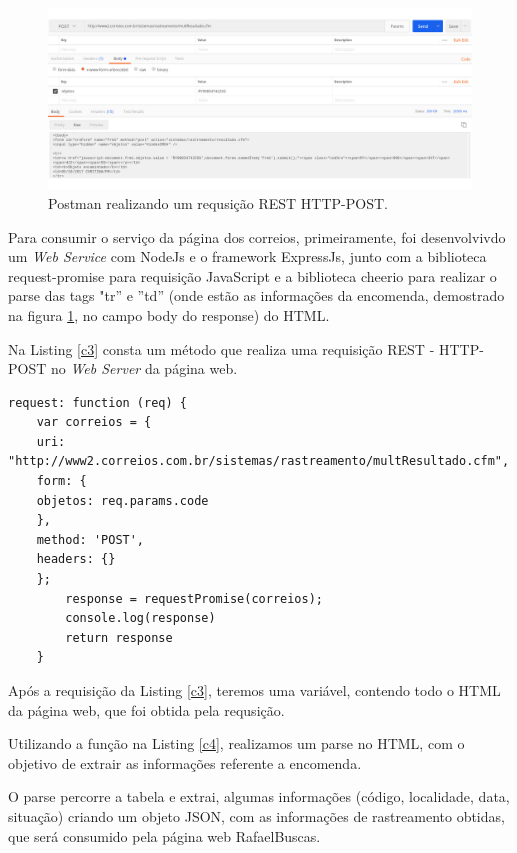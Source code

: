 \documentclass[12pt]{article}
\begin{document}
	 \begin{figure}[H]
	 	\centering
	 	\includegraphics[scale=0.3]{Imagens/c1.jpg}
	 	\caption{Postman realizando um requsição REST HTTP-POST.}
	 	\label{c1}
	 \end{figure}
	
	Para consumir o serviço da página dos correios, primeiramente, foi desenvolvivdo um \textit{Web Service} com NodeJs e o framework ExpressJs, junto com a biblioteca request-promise para requisição JavaScript e a biblioteca cheerio para realizar o parse das tags "tr'' e ''td'' (onde estão as informações da encomenda, demostrado na figura  \ref{c1}, no campo body do response) do HTML.
	
	Na Listing \ref{c3} consta um método que realiza uma requisição REST - HTTP-POST no \textit{Web Server} da página web.
	
	\medskip
	\begin{lstlisting}[caption=Criando Requisição em Java Script,label=c3]
	request: function (req) {
	var correios = {
	uri: "http://www2.correios.com.br/sistemas/rastreamento/multResultado.cfm",
	form: {
	objetos: req.params.code
	},
	method: 'POST',
	headers: {}
	};
		response = requestPromise(correios);
		console.log(response)
		return response
	}	
	\end{lstlisting}
	Após a requisição da Listing \ref{c3}, teremos uma variável, contendo todo o HTML da página web, que foi obtida pela requsição.
	
	Utilizando a função na Listing \ref{c4}, realizamos um parse no HTML, com o objetivo de extrair as informações referente a encomenda.
	
	O parse percorre a tabela e extrai, algumas informações (código, localidade, data, situação) criando um objeto JSON, com as informações de rastreamento obtidas, que será consumido pela página web RafaelBuscas.
	
\end{document}
